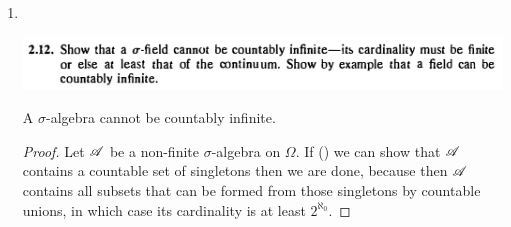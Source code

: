 \begin{enumerate}
\begin{enumerate}[label=(\alph*)]
\begin{proof}
      First let $\Omega$ be countable. We want to show that there exists a countable class of sets that
      generates $\ms F$. Indeed, the class of all singletons generates $\ms F$ and is countable.

      Next let $\Omega$ be uncountable. We want to show that every class of sets that generates $\ms F$ is
      uncountable.

      Suppose for a contradiction that $\ms F$ is countably generated and let $\ms A = \{A_1, A_2, \dots\}$ be
      a countable class of countable sets that generates $\ms F$. (We can stipulate that every element
      of $\ms A$ is countable since, if it is not, we may replace it with its complement, which is.)

      Let $\Omega_0 = \bigcup_i A_i$. Then $\Omega_0$ is countable
      and $\ms S_0 := \{\{\om\}: \om \in \Omega_0\}$ is a countable class of singletons. We see that $\ms A$ is
      generated by $\ms S_0$, and therefore that $\ms F$ is generated by $\ms S_0$.

      Now consider $\Omega^c_0$. We want to derive a contradiction, and presumably that contradiction is going
      to be concluding that $\Omega^c_0$ is countable when in fact we know it is uncountable, because $\Omega$
      is. 
    \end{proof}
  \end{enumerate}

  \newpage
\item~\\
  \begin{mdframed}
    \includegraphics[width=400pt]{img/analysis--berkeley-202a-hw-af2a.png}
  \end{mdframed}
  \begin{claim*}
    A $\sigma$-algebra cannot be countably infinite.
  \end{claim*}
  \begin{proof}
    Let $\ms A$ be a non-finite $\sigma$-algebra on $\Omega$. If () we can show that $\ms A$ contains a
    countable set of singletons then we are done, because then $\ms A$ contains all subsets that can be formed
    from those singletons by countable unions, in which case its cardinality is at least $2^{\aleph_0}$.
  \end{proof}



\end{enumerate}
